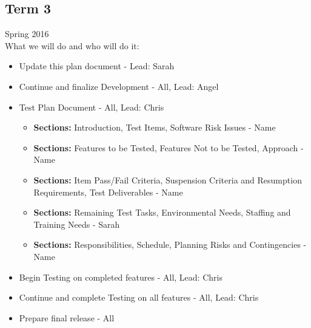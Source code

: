 \subsection{Term 3}
Spring 2016 \\
What we will do and who will do it:
\begin{itemize}
    \item Update this plan document - Lead: Sarah
	\item Continue and finalize Development - All, Lead: Angel
    \item Test Plan Document - All, Lead: Chris
        \begin{itemize}
            \item \textbf{Sections:} Introduction, Test Items, Software Risk Issues - Name
            \item \textbf{Sections:} Features to be Tested, Features Not to be Tested, Approach - Name
            \item \textbf{Sections:} Item Pass/Fail Criteria, Suspension Criteria and Resumption Requirements, Test Deliverables - Name
            \item \textbf{Sections:} Remaining Test Tasks, Environmental Needs, Staffing and Training Needs - Sarah 
            \item \textbf{Sections:} Responsibilities, Schedule, Planning Risks and Contingencies - Name
        \end{itemize}
	\item Begin Testing on completed features - All, Lead: Chris
	\item Continue and complete Testing on all features - All, Lead: Chris
	\item Prepare final release - All
\end{itemize}

